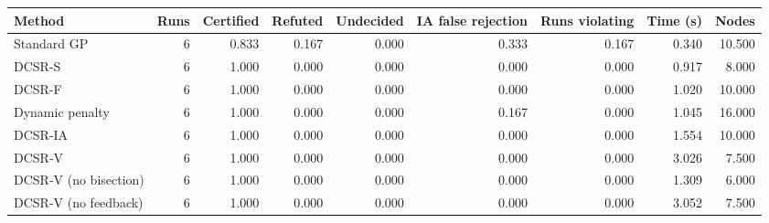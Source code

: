 \begin{tabular}{lrrrrrrrr}
\toprule
Method & Runs & Certified & Refuted & Undecided & IA false rejection & Runs violating & Time (s) & Nodes \\
\midrule
Standard GP & 6 & 0.833 & 0.167 & 0.000 & 0.333 & 0.167 & 0.340 & 10.500 \\
DCSR-S & 6 & 1.000 & 0.000 & 0.000 & 0.000 & 0.000 & 0.917 & 8.000 \\
DCSR-F & 6 & 1.000 & 0.000 & 0.000 & 0.000 & 0.000 & 1.020 & 10.000 \\
Dynamic penalty & 6 & 1.000 & 0.000 & 0.000 & 0.167 & 0.000 & 1.045 & 16.000 \\
DCSR-IA & 6 & 1.000 & 0.000 & 0.000 & 0.000 & 0.000 & 1.554 & 10.000 \\
DCSR-V & 6 & 1.000 & 0.000 & 0.000 & 0.000 & 0.000 & 3.026 & 7.500 \\
DCSR-V (no bisection) & 6 & 1.000 & 0.000 & 0.000 & 0.000 & 0.000 & 1.309 & 6.000 \\
DCSR-V (no feedback) & 6 & 1.000 & 0.000 & 0.000 & 0.000 & 0.000 & 3.052 & 7.500 \\
\bottomrule
\end{tabular}
